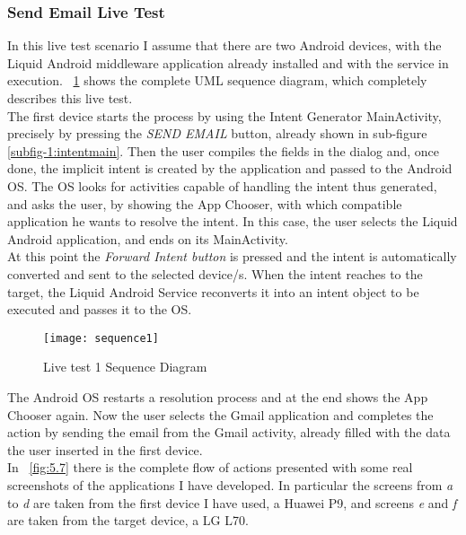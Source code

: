 \subsubsection{Send Email Live Test}
In this live test scenario I assume that there are two Android devices, with the Liquid Android middleware application already installed and with the service in execution.
\figurename~\ref{fig:5.6} shows the complete UML sequence diagram, which completely describes this live test.\\
The first device starts the process by using the Intent Generator MainActivity, precisely by pressing the \textit{SEND EMAIL} button, already shown in sub-figure \ref{subfig-1:intentmain}. Then the user compiles the fields in the dialog and, once done, the implicit intent is created by the application and passed to the Android OS. The OS looks for activities capable of handling the intent thus generated, and asks the user, by showing the App Chooser, with which compatible application he wants to resolve the intent. In this case, the user selects the Liquid Android application, and ends on its MainActivity.\\
At this point the \textit{Forward Intent button} is pressed and the intent is automatically converted and sent to the selected device/s. When the intent reaches to the target, the Liquid Android Service reconverts it into an intent object to be executed and passes it to the OS.
\begin{figure}[h]
	\centering
	\texttt{[image: sequence1]}
	\caption{Live test 1 Sequence Diagram}
	\label{fig:5.6}
\end{figure}
The Android OS restarts a resolution process and at the end shows the App Chooser again. Now the user selects the Gmail application and completes the action by sending the email from the Gmail activity, already filled with the data the user inserted in the first device.\\
In \figurename~\ref{fig:5.7} there is the complete flow of actions presented with some real screenshots of the applications I have developed. In particular the screens from \textit{a} to \textit{d} are taken from the first device I have used, a Huawei P9, and screens \textit{e} and \textit{f} are taken from the target device, a LG L70.
\\
